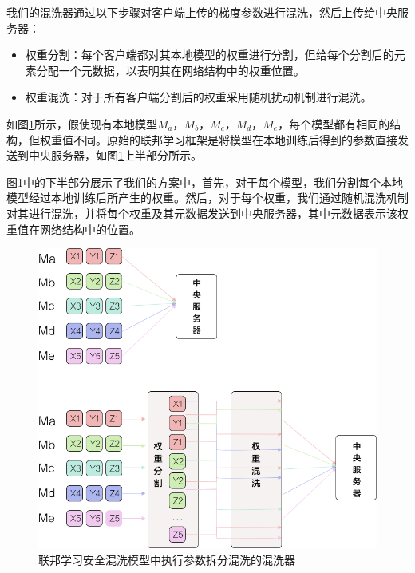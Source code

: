 我们的混洗器通过以下步骤对客户端上传的梯度参数进行混洗，然后上传给中央服务器：
\begin{itemize}
	\item 权重分割：每个客户端都对其本地模型的权重进行分割，但给每个分割后的元素分配一个元数据，以表明其在网络结构中的权重位置。
	\item 权重混洗：对于所有客户端分割后的权重采用随机扰动机制进行混洗。
\end{itemize}

如图\ref{fig:联邦学习安全混洗模型中执行参数拆分混洗的混洗器}所示，假使现有本地模型$M_{a}$，$M_{b}$，$M_{c}$，$M_{d}$，$M_{e}$，每个模型都有相同的结构，但权重值不同。原始的联邦学习框架是将模型在本地训练后得到的参数直接发送到中央服务器，如图\ref{fig:联邦学习安全混洗模型中执行参数拆分混洗的混洗器}上半部分所示。

图\ref{fig:联邦学习安全混洗模型中执行参数拆分混洗的混洗器}中的下半部分展示了我们的方案中，首先，对于每个模型，我们分割每个本地模型经过本地训练后所产生的权重。然后，对于每个权重，我们通过随机混洗机制对其进行混洗，并将每个权重及其元数据发送到中央服务器，其中元数据表示该权重值在网络结构中的位置。

\begin{figure}[!hbt]
\centering
	\includegraphics[scale=0.4]{fig2/C4/混洗器}%
	\caption{联邦学习安全混洗模型中执行参数拆分混洗的混洗器}
	\label{fig:联邦学习安全混洗模型中执行参数拆分混洗的混洗器}	
\end{figure}

